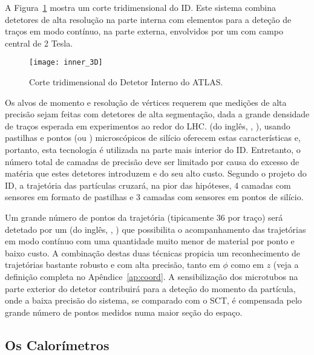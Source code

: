 A Figura~\ref{fig:atlas-id-3d} mostra um corte tridimensional do ID. Este
sistema combina detetores de alta resolução na parte interna com elementos
para a deteção de traços em modo contínuo, na parte externa, envolvidos por um
 com campo central de 2 Tesla.

\begin{figure}
\begin{center}
\texttt{[image: inner\_3D]}
\end{center}
\caption{Corte tridimensional do Detetor Interno do ATLAS.}
\label{fig:atlas-id-3d}
\end{figure}

Os alvos de momento e resolução de vértices requerem que medições de alta
precisão sejam feitas com detetores de alta segmentação, dada a grande
densidade de traços esperada em experimentos ao redor do LHC.  (do inglês, , ), usando pastilhas e
pontos (ou ) microscópicos de silício
oferecem estas características e, portanto, esta tecnologia é utilizada na
parte mais interior do ID. Entretanto, o número total de camadas de precisão
deve ser limitado por causa do excesso de matéria que estes detetores
introduzem e do seu alto custo. Segundo o projeto do ID, a trajetória das
partículas cruzará, na pior das hipóteses, 4 camadas com sensores em formato
de pastilhas e 3 camadas com sensores em pontos de silício.

Um grande número de pontos da trajetória (tipicamente 36 por traço) será
detetado por um  (do inglês,
, ) que possibilita o
acompanhamento das trajetórias em modo contínuo com uma quantidade muito menor
de material por ponto e baixo custo. A combinação destas duas técnicas
propicia um reconhecimento de trajetórias bastante robusto e com alta
precisão, tanto em $\phi$ como em $z$ (veja a definição completa no
Apêndice~\ref{ap:coord}. A sensibilização dos microtubos na parte exterior do
detetor contribuirá para a deteção do momento da partícula, onde a baixa
precisão do sistema, se comparado com o SCT, é compensada pelo grande número
de pontos medidos numa maior seção do espaço.

\subsection{Os Calorímetros}
\label{sec:atlas-calo}

